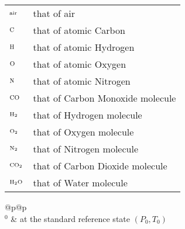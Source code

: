 \begin{supertabular}{@{}p{\lensymb}@{}p{\lenWHAT}}
    ${}_{\mbox{\scriptsize air}}$           & that of air                                                                   \\
    ${}_{\mbox{\scriptsize \ce{C}}}$        & that of atomic Carbon                                                         \\
    ${}_{\mbox{\scriptsize \ce{H}}}$        & that of atomic Hydrogen                                                       \\
    ${}_{\mbox{\scriptsize \ce{O}}}$        & that of atomic Oxygen                                                         \\
    ${}_{\mbox{\scriptsize \ce{N}}}$        & that of atomic Nitrogen                                                       \\
    ${}_{\mbox{\scriptsize \ce{CO}}}$       & that of Carbon Monoxide molecule                                              \\
    ${}_{\mbox{\scriptsize \ce{H2}}}$       & that of Hydrogen molecule                                                     \\
    ${}_{\mbox{\scriptsize \ce{O2}}}$       & that of Oxygen molecule                                                       \\
    ${}_{\mbox{\scriptsize \ce{N2}}}$       & that of Nitrogen molecule                                                     \\
    ${}_{\mbox{\scriptsize \ce{CO2}}}$      & that of Carbon Dioxide molecule                                               \\
    ${}_{\mbox{\scriptsize \ce{H2O}}}$      & that of Water molecule                                                        \\
\end{supertabular}
                                                                                                                      
\par\noindent\begin{supertabular}{@{}p{\lensymb}@{}p{\lenWHAT}}                                                       
     \\                                                                       
    ${}^0$                  & at the standard reference state $(P_0, T_0)$                                                  \\
\end{supertabular}

